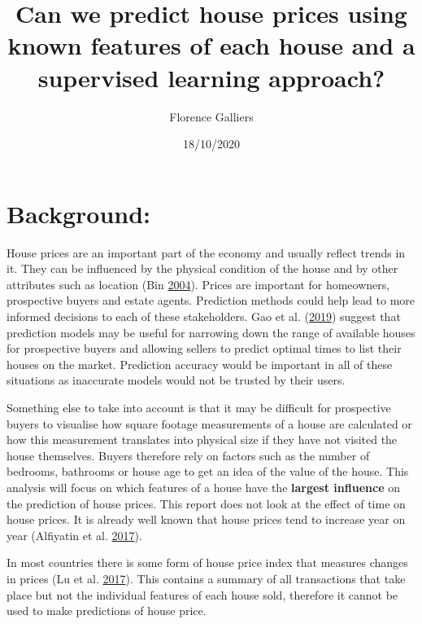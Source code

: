 \documentclass[
]{article}
\title{Can we predict house prices using known features of each house and a
supervised learning approach?}
\author{Florence Galliers}
\date{18/10/2020}
\begin{document}
\maketitle

{
\setcounter{tocdepth}{2}
\tableofcontents
}
\newpage

\hypertarget{background}{%
\section{Background:}\label{background}}

House prices are an important part of the economy and usually reflect
trends in it. They can be influenced by the physical condition of the
house and by other attributes such as location (Bin
\protect\hyperlink{ref-bin2004prediction}{2004}). Prices are important
for homeowners, prospective buyers and estate agents. Prediction methods
could help lead to more informed decisions to each of these
stakeholders. Gao et al. (\protect\hyperlink{ref-gao2019location}{2019})
suggest that prediction models may be useful for narrowing down the
range of available houses for prospective buyers and allowing sellers to
predict optimal times to list their houses on the market. Prediction
accuracy would be important in all of these situations as inaccurate
models would not be trusted by their users.

Something else to take into account is that it may be difficult for
prospective buyers to visualise how square footage measurements of a
house are calculated or how this measurement translates into physical
size if they have not visited the house themselves. Buyers therefore
rely on factors such as the number of bedrooms, bathrooms or house age
to get an idea of the value of the house. This analysis will focus on
which features of a house have the \textbf{largest influence} on the
prediction of house prices. This report does not look at the effect of
time on house prices. It is already well known that house prices tend to
increase year on year (Alfiyatin et al.
\protect\hyperlink{ref-alfiyatin2017modeling}{2017}).

In most countries there is some form of house price index that measures
changes in prices (Lu et al.
\protect\hyperlink{ref-lu2017hybrid}{2017}). This contains a summary of
all transactions that take place but not the individual features of each
house sold, therefore it cannot be used to make predictions of house
price.
\end{document}
